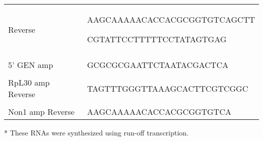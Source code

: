 \documentclass[12pt,oneside]{reedthesis}
\begin{document}
\begin{longtable}[]{@{}ll@{}}
\begin{minipage}[t]{0.42\columnwidth}
Reverse\strut
\end{minipage} & \begin{minipage}[t]{0.51\columnwidth}\raggedright
{AAGCAAAAACACCACGCGGTGTCAGCTT}

{CGTATTCCTTTTTC}CTATAGTGAG\strut
\end{minipage}\tabularnewline
\begin{minipage}[t]{0.42\columnwidth}\raggedright
\strut
\end{minipage} & \begin{minipage}[t]{0.51\columnwidth}\raggedright
\strut
\end{minipage}\tabularnewline
\begin{minipage}[t]{0.42\columnwidth}\raggedright
5' GEN amp\strut
\end{minipage} & \begin{minipage}[t]{0.51\columnwidth}\raggedright
GCGCGCGAATTCTAATACGACTCA\strut
\end{minipage}\tabularnewline
\begin{minipage}[t]{0.42\columnwidth}\raggedright
\strut
\end{minipage} & \begin{minipage}[t]{0.51\columnwidth}\raggedright
\strut
\end{minipage}\tabularnewline
\begin{minipage}[t]{0.42\columnwidth}\raggedright
RpL30 amp Reverse\strut
\end{minipage} & \begin{minipage}[t]{0.51\columnwidth}\raggedright
TAGTTTGGGTTAAAGCACTTCGTCGGC\strut
\end{minipage}\tabularnewline
\begin{minipage}[t]{0.42\columnwidth}\raggedright
\strut
\end{minipage} & \begin{minipage}[t]{0.51\columnwidth}\raggedright
\strut
\end{minipage}\tabularnewline
\begin{minipage}[t]{0.42\columnwidth}\raggedright
Non1 amp Reverse\strut
\end{minipage} & \begin{minipage}[t]{0.51\columnwidth}\raggedright
AAGCAAAAACACCACGCGGTGTCA\strut
\end{minipage}\tabularnewline
\bottomrule
\end{longtable}
* These RNAs were synthesized using run-off transcription.

\end{document}
